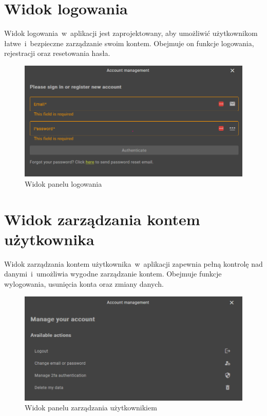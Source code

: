 \section{Widok logowania}
\label{sec:logowanie}

Widok logowania~w~aplikacji jest zaprojektowany, aby umożliwić użytkownikom łatwe~i~bezpieczne 
zarządzanie swoim kontem. Obejmuje on funkcje logowania, rejestracji oraz resetowania hasła.

\begin{figure}[H]
    \centering
    \includegraphics[width=1\textwidth]{attachments/logowanie}
    \caption{Widok panelu logowania}
    \label{fig:logowanie}
\end{figure}

\section{Widok zarządzania kontem użytkownika}
\label{sec:user}
Widok zarządzania kontem użytkownika~w~aplikacji zapewnia pełną kontrolę 
nad danymi~i~umożliwia wygodne zarządzanie kontem. Obejmuje funkcje wylogowania, usunięcia konta oraz zmiany danych.
\begin{figure}[H]
    \centering
    \includegraphics[width=1\textwidth]{attachments/user}
    \caption{Widok panelu zarządzania użytkownikiem}
    \label{fig:user}
\end{figure}

